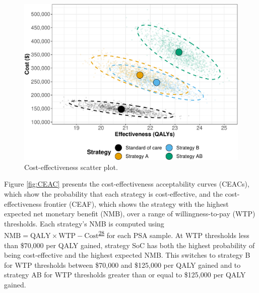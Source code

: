 \documentclass[
]{article}
\begin{document}
\begin{figure}[H]

{\centering \includegraphics{figs/CE-scatter-1} 

}

\caption{Cost-effectiveness scatter plot.}\label{fig:CE-scatter}
\end{figure}

Figure \ref{fig:CEAC} presents the cost-effectiveness acceptability curves (CEACs), which show the probability that each strategy is cost-effective, and the cost-effectiveness frontier (CEAF), which shows the strategy with the highest expected net monetary benefit (NMB), over a range of willingness-to-pay (WTP) thresholds. Each strategy's NMB is computed using \(\text{NMB} = \text{QALY} \times \text{WTP} - \text{Cost}\)\textsuperscript{\protect\hyperlink{ref-Stinnett1998b}{28}} for each PSA sample. At WTP thresholds less than \$70,000 per QALY gained, strategy SoC has both the highest probability of being cost-effective and the highest expected NMB. This switches to strategy B for WTP thresholds between \$70,000 and \$125,000 per QALY gained and to strategy AB for WTP thresholds greater than or equal to \$125,000 per QALY gained.
\end{document}
